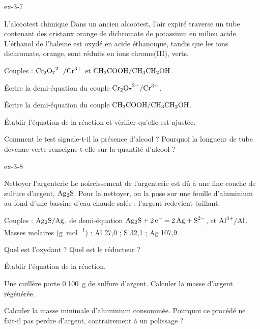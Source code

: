 \begin{blocLivre}{ex-3-7}
\begin{exercice}[2]{L'alcootest chimique}
Dans un ancien alcootest, l'air expiré traverse un tube contenant des cristaux orange de dichromate de potassium en milieu
acide. L'éthanol de l'haleine est oxydé en acide éthanoïque, tandis que les ions dichromate, orange, sont réduits en ions
chrome(III), verts.
\begin{donnees}
Couples : $\ce{Cr2O7^{2-}}/\ce{Cr^{3+}}$ et $\ce{CH3COOH}/\ce{CH3CH2OH}$.
\end{donnees}
\begin{questions}
\item Écrire la demi-équation du couple $\ce{Cr2O7^{2-}}/\ce{Cr^{3+}}$.
\item Écrire la demi-équation du couple $\ce{CH3COOH}/\ce{CH3CH2OH}$.
\item Établir l'équation de la réaction et vérifier qu'elle est ajustée.
\item Comment le test signale-t-il la présence d'alcool ? Pourquoi la longueur de tube devenue verte renseigne-t-elle sur la
quantité d'alcool ?
\end{questions}
\end{exercice}
\end{blocLivre}
\begin{blocLivre}{ex-3-8}
\begin{exercice}[2]{Nettoyer l'argenterie}
Le noircissement de l'argenterie est dû à une fine couche de sulfure d'argent, $\ce{Ag2S}$. Pour la nettoyer, on la pose sur
une feuille d'aluminium au fond d'une bassine d'eau chaude salée : l'argent redevient brillant.
\begin{donnees}
Couples : $\ce{Ag2S}/\ce{Ag}$, de demi-équation $\ce{Ag2S + 2e- = 2Ag + S^{2-}}$, et $\ce{Al^{3+}}/\ce{Al}$. Masses molaires (\unit{g.mol^{-1}}) :
Al 27,0 ; S 32,1 ; Ag 107,9.
\end{donnees}
\begin{questions}
\item Quel est l'oxydant ? Quel est le réducteur ?
\item Établir l'équation de la réaction.
\item Une cuillère porte \qty{0,100}{g} de sulfure d'argent. Calculer la masse d'argent régénérée.
\item Calculer la masse minimale d'aluminium consommée. Pourquoi ce procédé ne fait-il pas perdre d'argent, contrairement
à un polissage ?
\end{questions}
\end{exercice}
\end{blocLivre}
